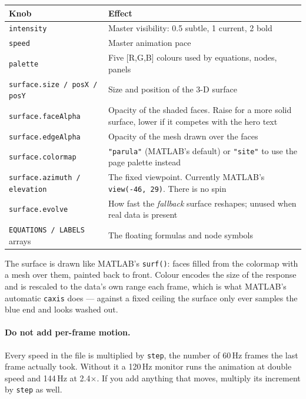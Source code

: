 \documentclass[11pt,a4paper]{article}
\begin{document}
\begin{center}
\begin{tabular}{@{}lp{8.4cm}@{}}
\toprule
\textbf{Knob} & \textbf{Effect} \\
\midrule
\texttt{intensity} & Master visibility: 0.5 subtle, 1 current, 2 bold \\
\texttt{speed}     & Master animation pace \\
\texttt{palette}   & Five [R,G,B] colours used by equations, nodes, panels \\
\texttt{surface.size / posX / posY} & Size and position of the 3-D surface \\
\texttt{surface.faceAlpha} & Opacity of the shaded faces. Raise for a more
  solid surface, lower if it competes with the hero text \\
\texttt{surface.edgeAlpha} & Opacity of the mesh drawn over the faces \\
\texttt{surface.colormap} & \texttt{"parula"} (MATLAB's default) or
  \texttt{"site"} to use the page palette instead \\
\texttt{surface.azimuth / elevation} & The fixed viewpoint. Currently
  MATLAB's \texttt{view(-46, 29)}. There is no spin \\
\texttt{surface.evolve} & How fast the \emph{fallback} surface reshapes;
  unused when real data is present \\
\texttt{EQUATIONS / LABELS} arrays & The floating formulas and node symbols \\
\bottomrule
\end{tabular}
\end{center}

The surface is drawn like MATLAB's \texttt{surf()}: faces filled from the
colormap with a mesh over them, painted back to front. Colour encodes the
size of the response and is rescaled to the data's own range each frame,
which is what MATLAB's automatic \texttt{caxis} does --- against a fixed
ceiling the surface only ever samples the blue end and looks washed out.

\paragraph{Do not add per-frame motion.} Every speed in the file is
multiplied by \texttt{step}, the number of 60\,Hz frames the last frame
actually took. Without it a 120\,Hz monitor runs the animation at double
speed and 144\,Hz at 2.4$\times$. If you add anything that moves, multiply
its increment by \texttt{step} as well.
\end{document}
